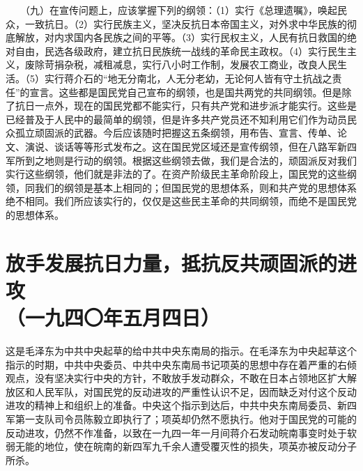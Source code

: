 \documentclass[cn,11pt,chinese]{elegantbook}
\def\myformat#1{\hfil\hfil #1}
\begin{document}
　　（九）在宣传问题上，应该掌握下列的纲领：（1）实行《总理遗嘱》，唤起民众，一致抗日。（2）实行民族主义，坚决反抗日本帝国主义，对外求中华民族的彻底解放，对内求国内各民族之间的平等。（3）实行民权主义，人民有抗日救国的绝对自由，民选各级政府，建立抗日民族统一战线的革命民主政权。（4）实行民生主义，废除苛捐杂税，减租减息，实行八小时工作制，发展农工商业，改良人民生活。（5）实行蒋介石的“地无分南北，人无分老幼，无论何人皆有守土抗战之责任”的宣言。这些都是国民党自己宣布的纲领，也是国共两党的共同纲领。但是除了抗日一点外，现在的国民党都不能实行，只有共产党和进步派才能实行。这些是已经普及于人民中的最简单的纲领，但是许多共产党员还不知利用它们作为动员民众孤立顽固派的武器。今后应该随时把握这五条纲领，用布告、宣言、传单、论文、演说、谈话等等形式发布之。这在国民党区域还是宣传纲领，但在八路军新四军所到之地则是行动的纲领。根据这些纲领去做，我们是合法的，顽固派反对我们实行这些纲领，他们就是非法的了。在资产阶级民主革命阶段上，国民党的这些纲领，同我们的纲领是基本上相同的；但国民党的思想体系，则和共产党的思想体系绝不相同。我们所应该实行的，仅仅是这些民主革命的共同纲领，而绝不是国民党的思想体系。\\
\newpage\section*{\myformat{放手发展抗日力量，抵抗反共顽固派的进攻}\\\myformat{（一九四〇年五月四日）}}
\begin{introduction}\item  这是毛泽东为中共中央起草的给中共中央东南局的指示。在毛泽东为中央起草这个指示的时期，中共中央委员、中共中央东南局书记项英的思想中存在着严重的右倾观点，没有坚决实行中央的方针，不敢放手发动群众，不敢在日本占领地区扩大解放区和人民军队，对国民党的反动进攻的严重性认识不足，因而缺乏对付这个反动进攻的精神上和组织上的准备。中央这个指示到达后，中共中央东南局委员、新四军第一支队司令员陈毅立即执行了；项英却仍然不愿执行。他对于国民党的可能的反动进攻，仍然不作准备，以致在一九四一年一月间蒋介石发动皖南事变时处于软弱无能的地位，使在皖南的新四军九千余人遭受覆灭性的损失，项英亦被反动分子所杀。\end{introduction}
\end{document}
